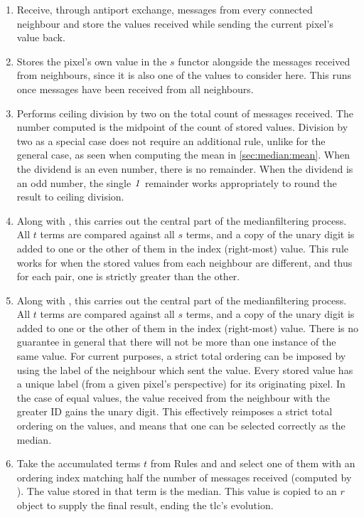 \begin{enumerate}
    \item Receive, through antiport exchange, messages from every connected neighbour and store the values received while sending the current pixel's value back.
    \item Stores the pixel's own value in the \(s\) \gls{functor} alongside the messages received from neighbours, since it is also one of the values to consider here.  This runs once messages have been received from all neighbours.
    \item Performs ceiling division by two on the total count of messages received.  The number computed is the midpoint of the count of stored values.  Division by two as a special case does not require an additional rule, unlike for the general case, as seen when computing the mean in \vref{sec:median:mean}.  When the dividend is an even number, there is no remainder.  When the dividend is an odd number, the single \(\mathit{1}\) remainder works appropriately to round the result to ceiling division.
    \item Along with , this carries out the central part of the \gls{medianfilter}ing process.  All \(t\) terms are compared against all \(s\) terms, and a copy of the unary digit is added to one or the other of them in the index (right-most) value.  This rule works for when the stored values from each neighbour are different, and thus for each pair, one is strictly greater than the other.
    \item Along with , this carries out the central part of the \gls{medianfilter}ing process.  All \(t\) terms are compared against all \(s\) terms, and a copy of the unary digit is added to one or the other of them in the index (right-most) value.  There is no guarantee in general that there will not be more than one instance of the same value.  For current purposes, a strict total ordering can be imposed by using the label of the neighbour which sent the value.  Every stored value has a unique label (from a given pixel's perspective) for its originating pixel.  In the case of equal values, the value received from the neighbour with the greater ID gains the unary digit.  This effectively reimposes a strict total ordering on the values, and means that one can be selected correctly as the median.
    \item Take the accumulated terms \(t\) from Rules  and  and select one of them with an ordering index matching half the number of messages received (computed by ).  The value stored in that term is the median.  This value is copied to an \(r\) object to supply the final result, ending the \gls{tlc}'s evolution.
\end{enumerate}

